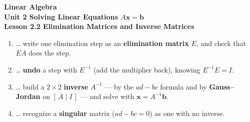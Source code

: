 \documentclass[10pt]{article}
\begin{document}
\vspace{-0.8in}

\begin{center}
  {\color{white}\textbf{\LARGE Linear Algebra}}\\[4pt]
  {\color{blushmid}\large\textbf{Unit 2 \quad Solving Linear Equations $A\mathbf{x}=\mathbf{b}$}}\\[6pt]
  {\color{white}\textbf{\large Lesson 2.2 \quad Elimination Matrices and Inverse Matrices}}
\end{center}

\vspace{0.22in}
\namedateperiod
\vspace{0.18in}

\begin{learningtargetbox}
\small
\begin{enumerate}[leftmargin=1.5em, itemsep=5pt]
  \item \ldots{} write one elimination step as an \textbf{elimination matrix} $E$, and check that $EA$ does the step.
  \item \ldots{} \textbf{undo} a step with $E^{-1}$ (add the multiplier back), knowing $E^{-1}E=I$.
  \item \ldots{} build a $2\times2$ \textbf{inverse} $A^{-1}$ --- by the $ad-bc$ formula and by \textbf{Gauss--Jordan} on $[\,A\mid I\,]$ --- and solve with $\mathbf{x}=A^{-1}\mathbf{b}$.
  \item \ldots{} recognize a \textbf{singular} matrix ($ad-bc=0$) as one with no inverse.
\end{enumerate}
\end{learningtargetbox}

\vspace{0.14in}
\end{document}
